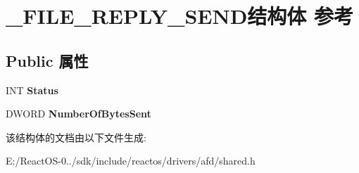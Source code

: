 \hypertarget{struct___f_i_l_e___r_e_p_l_y___s_e_n_d}{}\section{\+\_\+\+F\+I\+L\+E\+\_\+\+R\+E\+P\+L\+Y\+\_\+\+S\+E\+N\+D结构体 参考}
\label{struct___f_i_l_e___r_e_p_l_y___s_e_n_d}
\subsection*{Public 属性}
\begin{DoxyCompactItemize}
\item 
\mbox{\label{struct___f_i_l_e___r_e_p_l_y___s_e_n_d_a7e298a69b74250edd26d450005db6956}} 
I\+NT {\bfseries Status}
\item 
\mbox{\label{struct___f_i_l_e___r_e_p_l_y___s_e_n_d_a9c7f610bd9a7823dec3853cb10606d38}} 
D\+W\+O\+RD {\bfseries Number\+Of\+Bytes\+Sent}
\end{DoxyCompactItemize}


该结构体的文档由以下文件生成\+:\begin{DoxyCompactItemize}
\item 
E\+:/\+React\+O\+S-\/0../sdk/include/reactos/drivers/afd/shared.\+h\end{DoxyCompactItemize}
